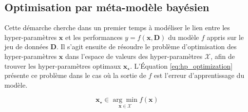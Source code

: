 
\subsection{Optimisation par méta-modèle bayésien} \label{subsec:bayesian_opt}
%
% 

Cette démarche cherche dans un premier temps à modéliser le lien entre les hyper-paramètres $\boldsymbol{x}$ et les performances $y = f(\boldsymbol{x}, \boldsymbol{D})$ du modèle $f$ appris sur le jeu de données $\boldsymbol{D}$.
Il s'agit ensuite de résoudre le problème d'optimisation des hyper-paramètres $\boldsymbol{x}$ dans l'espace de valeurs des hyper-paramètres $\mathcal{X}$, afin de trouver les hyper-paramètres optimaux $\boldsymbol{x}_{\star}$.
L'Équation \ref{eq:hp_optimization} présente ce problème dans le cas où la sortie de $f$ est l'erreur d'apprentissage du modèle.

\begin{equation} \label{eq:hp_optimization}
\boldsymbol{x}_{\star} \in \underset{\boldsymbol{x} \in \mathcal{X}}{\arg \min } f(\boldsymbol{x})
\end{equation}

